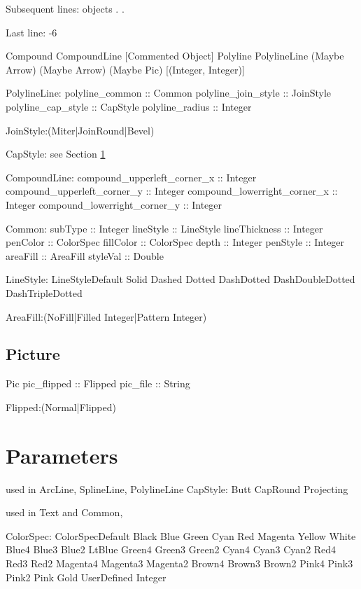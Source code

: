 \documentclass[10pt, a4paper]{article}
\begin{document}
 Subsequent lines:
        objects
        .
        .

    Last line:
        -6

Compound CompoundLine [Commented Object]	 
Polyline PolylineLine (Maybe Arrow) (Maybe Arrow) (Maybe Pic) [(Integer, Integer)]	 



PolylineLine:
polyline\_common :: Common
polyline\_join\_style :: JoinStyle
polyline\_cap\_style :: CapStyle
polyline\_radius :: Integer

JoinStyle:(Miter|JoinRound|Bevel)

CapStyle: see Section \ref{sec:param}


CompoundLine:
compound\_upperleft\_corner\_x :: Integer
compound\_upperleft\_corner\_y :: Integer
compound\_lowerright\_corner\_x :: Integer
compound\_lowerright\_corner\_y :: Integer






Common:
subType :: Integer
lineStyle :: LineStyle
lineThickness :: Integer
penColor :: ColorSpec
fillColor :: ColorSpec
depth :: Integer
penStyle :: Integer
areaFill :: AreaFill
styleVal :: Double

LineStyle:
LineStyleDefault	 
Solid	 
Dashed	 
Dotted	 
DashDotted	 
DashDoubleDotted	 
DashTripleDotted	 



AreaFill:(NoFill|Filled Integer|Pattern Integer)






\subsection{Picture}
Pic	 
pic\_flipped :: Flipped
pic\_file :: String

Flipped:(Normal|Flipped)



\section{Parameters}\label{sec:param}



used in ArcLine, SplineLine, PolylineLine
CapStyle:
Butt	 
CapRound	 
Projecting	 


used in Text and Common, 

ColorSpec:
ColorSpecDefault	 
Black	 
Blue	 
Green	 
Cyan	 
Red	 
Magenta	 
Yellow	 
White	 
Blue4	 
Blue3	 
Blue2	 
LtBlue	 
Green4	 
Green3	 
Green2	 
Cyan4	 
Cyan3	 
Cyan2	 
Red4	 
Red3	 
Red2	 
Magenta4	 
Magenta3	 
Magenta2	 
Brown4	 
Brown3	 
Brown2	 
Pink4	 
Pink3	 
Pink2	 
Pink	 
Gold	 
UserDefined Integer	 
\end{document}
